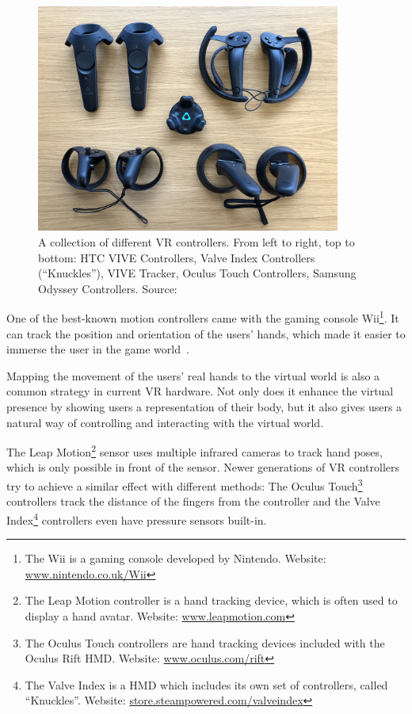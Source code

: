 \begin{figure}[H]%
	\centering%
	\includegraphics[width=10cm]{figures/introduction/vr_controllers.jpg}%
  \caption[Collection of VR controllers]{A collection of different \gls{VR} controllers. From left to right, top to bottom: HTC VIVE Controllers, Valve Index Controllers (\enquote{Knuckles}), VIVE Tracker, Oculus Touch Controllers, Samsung Odyssey Controllers.
  \newline{}
  Source:~\cite{Yang.2018}}\label{fig:vr-controllers}
\end{figure}

One of the best-known motion controllers came with the gaming console Wii\footnote{The Wii is a gaming console developed by Nintendo. Website: \href{https://www.nintendo.co.uk/Wii/Wii-94559.html}{www.nintendo.co.uk/Wii}}. It can track the position and orientation of the users' hands, which made it easier to immerse the user in the game world~\cite[2]{Kamm.2018}.

Mapping the movement of the users' real hands to the virtual world is also a common strategy in current \gls{VR} hardware. Not only does it enhance the virtual presence by showing users a representation of their body, but it also gives users a natural way of controlling and interacting with the virtual world.

The Leap Motion\footnote{The Leap Motion controller is a hand tracking device, which is often used to display a hand avatar. Website: \href{https://www.leapmotion.com/}{www.leapmotion.com}} sensor uses multiple infrared cameras to track hand poses, which is only possible in front of the sensor. Newer generations of \gls{VR} controllers try to achieve a similar effect with different methods: The Oculus Touch\footnote{The Oculus Touch controllers are hand tracking devices included with the Oculus Rift \gls{HMD}. Website: \href{https://www.oculus.com/rift/}{www.oculus.com/rift}} controllers track the distance of the fingers from the controller and the Valve Index\footnote{The Valve Index is a \gls{HMD} which includes its own set of controllers, called \enquote{Knuckles}. Website: \href{https://store.steampowered.com/valveindex}{store.steampowered.com/valveindex}} controllers even have pressure sensors built-in.

